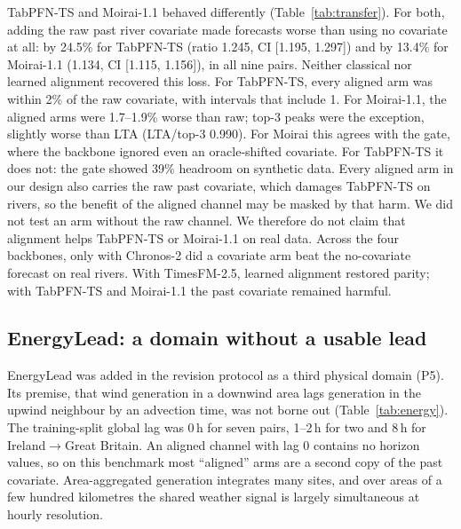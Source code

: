 \documentclass[preprint,11pt,authoryear]{elsarticle}
\newcommand{\lta}{\textsc{LTA}}
\begin{document}
TabPFN-TS and Moirai-1.1 behaved differently (Table~\ref{tab:transfer}). For both, adding the raw past river covariate made forecasts worse than using no covariate at all: by 24.5\% for TabPFN-TS (ratio 1.245, CI [1.195, 1.297]) and by 13.4\% for Moirai-1.1 (1.134, CI [1.115, 1.156]), in all nine pairs. Neither classical nor learned alignment recovered this loss. For TabPFN-TS, every aligned arm was within 2\% of the raw covariate, with intervals that include 1. For Moirai-1.1, the aligned arms were 1.7--1.9\% worse than raw; top-3 peaks were the exception, slightly worse than \lta{} (\lta{}/top-3 0.990). For Moirai this agrees with the gate, where the backbone ignored even an oracle-shifted covariate. For TabPFN-TS it does not: the gate showed 39\% headroom on synthetic data. Every aligned arm in our design also carries the raw past covariate, which damages TabPFN-TS on rivers, so the benefit of the aligned channel may be masked by that harm. We did not test an arm without the raw channel. We therefore do not claim that alignment helps TabPFN-TS or Moirai-1.1 on real data. Across the four backbones, only with Chronos-2 did a covariate arm beat the no-covariate forecast on real rivers. With TimesFM-2.5, learned alignment restored parity; with TabPFN-TS and Moirai-1.1 the past covariate remained harmful.

\subsection{EnergyLead: a domain without a usable lead}
\label{sec:energy}

EnergyLead was added in the revision protocol as a third physical domain (P5). Its premise, that wind generation in a downwind area lags generation in the upwind neighbour by an advection time, was not borne out (Table~\ref{tab:energy}). The training-split global lag was 0\,h for seven pairs, 1--2\,h for two and 8\,h for Ireland$\to$Great Britain. An aligned channel with lag 0 contains no horizon values, so on this benchmark most ``aligned'' arms are a second copy of the past covariate. Area-aggregated generation integrates many sites, and over areas of a few hundred kilometres the shared weather signal is largely simultaneous at hourly resolution.
\end{document}
